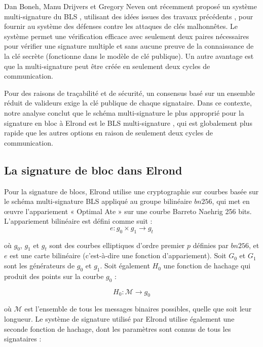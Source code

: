 \documentclass[journal]{IEEEtran}
\begin{document}
Dan Boneh, Manu Drijvers et Gregory Neven ont récemment proposé un système multi-signature du BLS \cite{5}, utilisant des idées issues des travaux précédents \cite{35}, \cite{30} pour fournir au système des défenses contre les attaques de clés malhonnêtes. Le système permet une vérification efficace avec seulement deux paires nécessaires pour vérifier une signature multiple et sans aucune preuve de la connaissance de la clé secrète (fonctionne dans le modèle de clé publique). Un autre avantage est que la multi-signature peut être créée en seulement deux cycles de communication.

Pour des raisons de traçabilité et de sécurité, un consensus basé sur un ensemble réduit de valideurs exige la clé publique de chaque signataire. Dans ce contexte, notre analyse conclut que le schéma multi-signature le plus approprié pour la signature en bloc à Elrond est le BLS multi-signature \cite{5}, qui est globalement plus rapide que les autres options en raison de seulement deux cycles de communication.

\subsection{La signature de bloc dans Elrond}
Pour la signature de blocs, Elrond utilise une cryptographie sur courbes basée sur le schéma multi-signature BLS appliqué au groupe bilinéaire $bn256$, qui met en œuvre l'appariement « Optimal Ate » sur une courbe Barreto Naehrig 256 bits. L’appariement bilinéaire est défini comme suit :
\begin{equation}
\label{1}
   e : {g}_{0} \times {g}_{1} \to {g}_{t} 
\end{equation}

où ${g}_{0}$, ${g}_{1}$ et ${g}_{t}$ sont des courbes elliptiques d'ordre premier $p$ définies par $bn256$, et $e$ est une carte bilinéaire (c'est-à-dire une fonction d'appariement). Soit ${G}_{0}$ et ${G}_{1}$ sont les générateurs de ${g}_{0}$ et ${g}_{1}$. Soit également ${H}_{0}$ une fonction de hachage qui produit des points sur la courbe ${g}_{0}$ :

\begin{equation}
\label{2}
   {H}_{0} : \mathcal{M} \to {g}_{0} 
\end{equation}

où $\mathcal{M}$ est l'ensemble de tous les messages binaires possibles, quelle que soit leur longueur. Le système de signature utilisé par Elrond utilise également une seconde fonction de hachage, dont les paramètres sont connus de tous les signataires :
\end{document}

